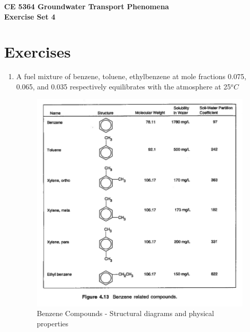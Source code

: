 \documentclass[12pt]{article}
\begin{document}
\begin{center}
{\textbf{{ CE 5364 Groundwater Transport Phenomena } \\ {Exercise Set 4}}}
\end{center}

\section*{\small{Exercises}}
\begin{enumerate} %


\item 

A fuel mixture of benzene, toluene, ethylbenzene at mole fractions 0.075, 0.065, and 0.035 respectively equilibrates with the atmosphere at 25$^oC$

\begin{figure}[h!] %
   \centering
   \includegraphics[width=5in]{Fig4-13.png} 
   \caption{Benzene Compounds - Structural diagrams and physical properties}
   \label{fig:plumemap}
\end{figure}


\end{enumerate}
\end{document}
